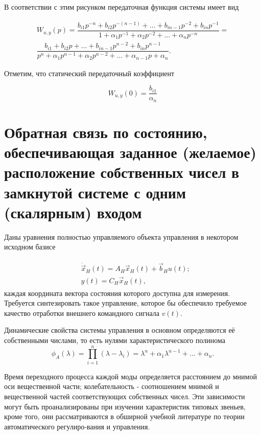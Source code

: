 В соответствии с этим рисунком передаточная функция системы имеет вид

\begin{multline}
	W_{u,y}(p) = \dfrac{b_{i1}p^{-n}+b_{i2}p^{-(n-1)}+\dots+b_{in-1}p^{-2}+b_{in}p^{-1}}{1+\alpha_1p^{-1}+\alpha_2p^{-2}+\dots+\alpha_np^{-n}} = \\
	\dfrac{b_{i1}+b_{i2}p+\dots+b_{in-1}p^{n-2}+b_{in}p^{n-1}}{p^n+\alpha_1p^{n-1}+\alpha_2p^{n-2}+\dots+\alpha_{n-1}p+\alpha_n}.
\end{multline}

Отметим, что статический передаточный коэффициент

\begin{equation}
	W_{u,y}(0)=\dfrac{b_{i1}}{\alpha_n}
\end{equation}

\newpage

\section{Обратная связь по состоянию, обеспечивающая заданное (желаемое) расположение собственных чисел в замкнутой системе с одним (скалярным) входом}

Даны уравнения полностью управляемого объекта управления в некотором исходном базисе

\begin{gather}
\begin{split}
	&\dot{\vec{x}}_H(t) = A_H\vec{x}_H(t)+\vec{b}_Hu(t);\\
	&y(t)=C_H\vec{x}_H(t),
\end{split}
\end{gather}
каждая координата вектора состояния которого доступна для измерения.
Требуется синтезировать такое управление, которое бы обеспечило требуемое качество отработки внешнего командного сигнала $v(t)$.

Динамические свойства системы управления в основном определяются её собственными числами, то есть нулями характеристического полинома
\begin{equation}
	\phi_A(\lambda) = \prod_{i=1}^{n}(\lambda - \lambda_i)=\lambda^n+\alpha_1\lambda^{n-1}+\dots+\alpha_n.
\end{equation}

Время переходного процесса каждой моды определяется расстоянием до мнимой оси вещественной части; колебательность - соотношением мнимой и вещественной частей соответствующих собственных чисел. Эти зависимости могут быть проанализированы при изучении характеристик типовых звеньев, кроме того, они рассматриваются в обширной учебной литературе по теории автоматического регулиро-вания и управления.

